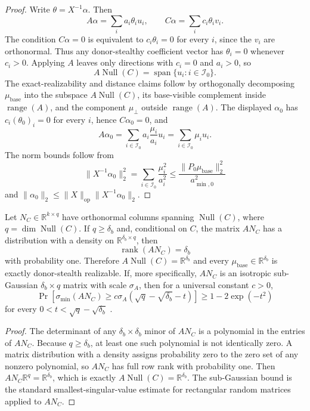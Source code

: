 \begin{proof}
Write $\theta=X^{-1}\alpha$. Then
\[
A\alpha=\sum_i a_i\theta_i u_i,
\qquad
C\alpha=\sum_i c_i\theta_i v_i.
\]
The condition $C\alpha=0$ is equivalent to $c_i\theta_i=0$ for every $i$, since the $v_i$ are orthonormal. Thus any donor-stealthy coefficient vector has $\theta_i=0$ whenever $c_i>0$. Applying $A$ leaves only directions with $c_i=0$ and $a_i>0$, so
\[
A\operatorname{Null}(C)=\operatorname{span}\{u_i:i\in\mathcal{I}_0\}.
\]
The exact-realizability and distance claims follow by orthogonally decomposing $\mu_{\text{base}}$ into the subspace $A\operatorname{Null}(C)$, its base-visible complement inside $\operatorname{range}(A)$, and the component $\mu_\perp$ outside $\operatorname{range}(A)$. The displayed $\alpha_0$ has $c_i(\theta_0)_i=0$ for every $i$, hence $C\alpha_0=0$, and
\[
A\alpha_0=\sum_{i\in\mathcal{I}_0}a_i\frac{\mu_i}{a_i}u_i
=
\sum_{i\in\mathcal{I}_0}\mu_i u_i.
\]
The norm bounds follow from
\[
\|X^{-1}\alpha_0\|_2^2
=
\sum_{i\in\mathcal{I}_0}\frac{\mu_i^2}{a_i^2}
\le
\frac{\|P_0\mu_{\text{base}}\|_2^2}{a_{\min,0}^2}
\]
and $\|\alpha_0\|_2\le \|X\|_{\mathrm{op}}\|X^{-1}\alpha_0\|_2$.
\end{proof}

\begin{corollary}
\label{cor:random-anchor-realizability}
Let $N_C\in\mathbb{R}^{k\times q}$ have orthonormal columns spanning $\operatorname{Null}(C)$, where $q=\dim\operatorname{Null}(C)$. If $q\ge \delta_b$ and, conditional on $C$, the matrix $AN_C$ has a distribution with a density on $\mathbb{R}^{\delta_b\times q}$, then
\[
\operatorname{rank}(AN_C)=\delta_b
\]
with probability one. Therefore $A\operatorname{Null}(C)=\mathbb{R}^{\delta_b}$ and every $\mu_{\text{base}}\in\mathbb{R}^{\delta_b}$ is exactly donor-stealth realizable. If, more specifically, $AN_C$ is an isotropic sub-Gaussian $\delta_b\times q$ matrix with scale $\sigma_A$, then for a universal constant $c>0$,
\[
\Pr\left[\sigma_{\min}(AN_C)\ge c\sigma_A(\sqrt{q}-\sqrt{\delta_b}-t)\right]
\ge
1-2\exp(-t^2)
\]
for every $0<t<\sqrt{q}-\sqrt{\delta_b}$ \citep{rudelsonvershynin2009smallest}.
\end{corollary}

\begin{proof}
The determinant of any $\delta_b\times\delta_b$ minor of $AN_C$ is a polynomial in the entries of $AN_C$. Because $q\ge \delta_b$, at least one such polynomial is not identically zero. A matrix distribution with a density assigns probability zero to the zero set of any nonzero polynomial, so $AN_C$ has full row rank with probability one. Then $AN_C\mathbb{R}^q=\mathbb{R}^{\delta_b}$, which is exactly $A\operatorname{Null}(C)=\mathbb{R}^{\delta_b}$. The sub-Gaussian bound is the standard smallest-singular-value estimate for rectangular random matrices applied to $AN_C$.
\end{proof}


